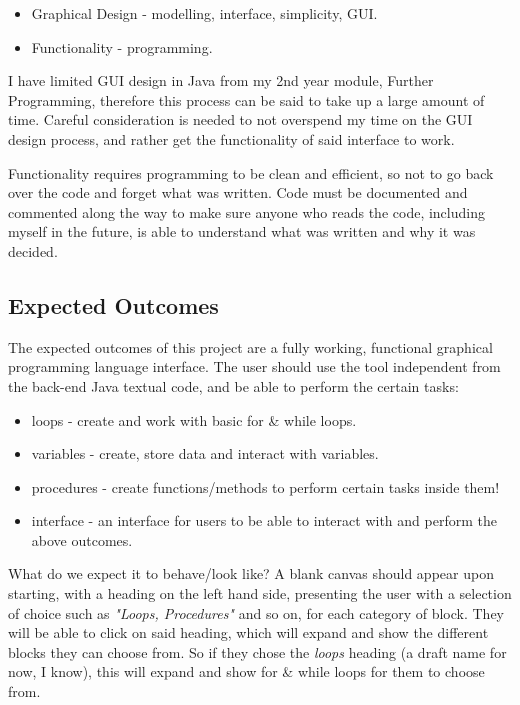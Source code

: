 \documentclass[a4paper, 12pt]{article}
\begin{document}
            \begin{itemize}
                \item Graphical Design - modelling, interface, simplicity, GUI.
                \item Functionality - programming.
            \end{itemize}

            I have limited GUI design in Java from my 2nd year module, Further Programming, therefore this 
            process can be said to take up a large amount of time. Careful consideration is needed to 
            not overspend my time on the GUI design process, and rather get the functionality of said 
            interface to work.

            Functionality requires programming to be clean and efficient, so not to go back over the code 
            and forget what was written. Code must be documented and commented along the way to make sure 
            anyone who reads the code, including myself in the future, is able to understand what was 
            written and why it was decided.

            \subsection{Expected Outcomes}
            The expected outcomes of this project are a fully working, functional graphical programming 
            language interface. The user should use the tool independent from the back-end Java textual 
            code, and be able to perform the certain tasks:

            \begin{itemize}
                \item loops - create and work with basic for \& while loops.
                \item variables - create, store data and interact with variables.
                \item procedures - create functions/methods to perform certain tasks inside them!
                \item interface - an interface for users to be able to interact with and perform the
                above outcomes.
            \end{itemize}

            What do we expect it to behave/look like? A blank canvas should appear upon starting, with
            a heading on the left hand side, presenting the user with a selection of choice such as
            \textit{"Loops, Procedures"} and so on, for each category of block. They will be able to click
            on said heading, which will expand and show the different blocks they can choose from. So if
            they chose the \textit{loops} heading (a draft name for now, I know), this will expand and show
            for \& while loops for them to choose from.
\end{document}
